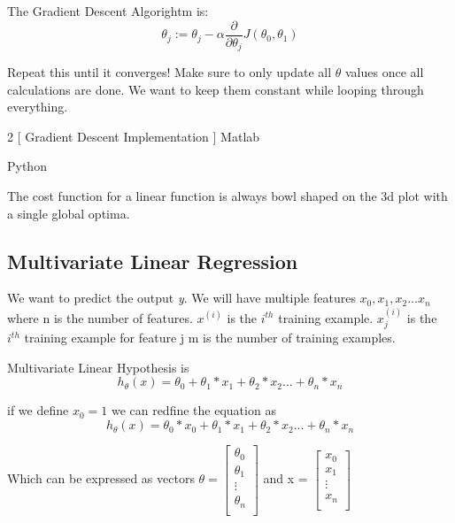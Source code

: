 The Gradient Descent Algorightm is:
\begin{equation}
  \theta_j := \theta_j - \alpha \frac{\partial}{\partial \theta_j} J(\theta_0, \theta_1)
\end{equation}

Repeat this until it converges!  Make sure to only update all $\theta$ values once all calculations are done.  We want to keep them constant while looping through everything.
\newpage
\begin{multicols}{2}
  [
    Gradient Descent Implementation
  ]
  Matlab\\
  \columnbreak

  Python\\
  
\end{multicols}

The cost function for a linear function is always bowl shaped on the 3d plot with a single global optima.

\subsection{Multivariate Linear Regression}

We want to predict the output \textit{y}.
We will have multiple features $x_{0}, x_{1}, x_{2} ... x_{n}$ where n is the number of features.
$x^{(i)}$ is the $i^{th}$ training example.
$x^{(i)}_{j}$ is the $i^{th}$ training example for feature j
m is the number of training examples.

Multivariate Linear Hypothesis is
\begin{equation}
  h_{\theta}(x) = \theta_{0} + \theta_{1} * x_{1} + \theta_{2} * x_{2} ... + \theta_{n} * x_{n}
\end{equation}

if we define $x_{0} = 1$ we can redfine the equation as 
\begin{equation}
  h_{\theta}(x) = \theta_{0}*x_{0} + \theta_{1} * x_{1} + \theta_{2} * x_{2} ... + \theta_{n} * x_{n}
\end{equation}

Which can be expressed as vectors $
\theta = 
\begin{bmatrix}
  \theta_{0} \\
  \theta_{1} \\
  \vdots    \\ 
  \theta_{n} \\
\end{bmatrix} $
and x = $
\begin{bmatrix}
  x_{0} \\
  x_{1} \\
  \vdots    \\ 
  x_{n} \\
\end{bmatrix} $

